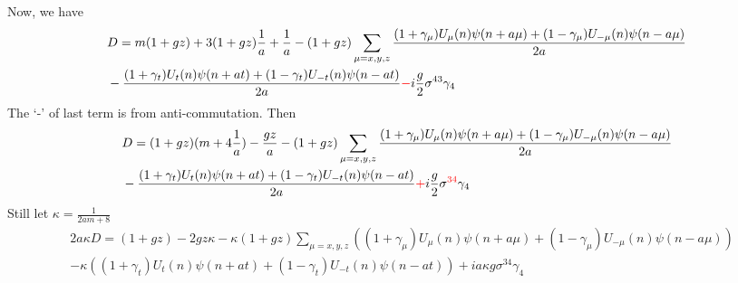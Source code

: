 Now, we have
\begin{equation}
\begin{split}
&D=m(1+gz)+3(1+gz)\frac{1}{a} + \frac{1}{a} - (1+g z)\sum _{\mu = x,y,z}\frac{(1+\gamma _{\mu})U_{\mu}(n)\psi(n+a\mu)+(1-\gamma _{\mu})U_{-\mu}(n)\psi(n-a\mu)}{2a}\\
&- \frac{(1+\gamma _{t})U_{t}(n)\psi(n+at)+(1-\gamma _{t})U_{-t}(n)\psi(n-at)}{2a}\textcolor[rgb]{1,0,0}{-}i\frac{g}{2} \sigma ^{43}\gamma _4
\end{split}
\end{equation}
The `-' of last term is from anti-commutation. Then
\begin{equation}
\begin{split}
&D=(1+gz)(m+4\frac{1}{a}) - \frac{gz}{a} - (1+g z)\sum _{\mu = x,y,z}\frac{(1+\gamma _{\mu})U_{\mu}(n)\psi(n+a\mu)+(1-\gamma _{\mu})U_{-\mu}(n)\psi(n-a\mu)}{2a}\\
&- \frac{(1+\gamma _{t})U_{t}(n)\psi(n+at)+(1-\gamma _{t})U_{-t}(n)\psi(n-at)}{2a}\textcolor[rgb]{1,0,0}{+}i\frac{g}{2} \sigma ^{\textcolor[rgb]{1,0,0}{34}}\gamma _4
\end{split}
\end{equation}
Still let $\kappa = \frac{1}{2am + 8}$
\begin{equation}
\begin{split}
&2a\kappa D=(1+gz) - 2gz\kappa - \kappa(1+g z)\sum _{\mu = x,y,z}\left((1+\gamma _{\mu})U_{\mu}(n)\psi(n+a\mu)+(1-\gamma _{\mu})U_{-\mu}(n)\psi(n-a\mu)\right)\\
&- \kappa\left((1+\gamma _{t})U_{t}(n)\psi(n+at)+(1-\gamma _{t})U_{-t}(n)\psi(n-at)\right)+ia\kappa g \sigma ^{34}\gamma _4
\end{split}
\end{equation}

